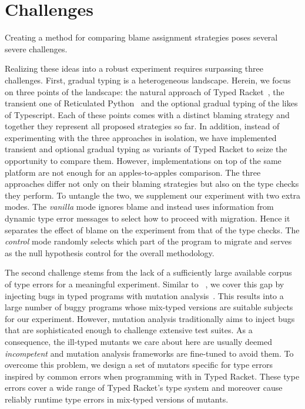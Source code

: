 
\section{Challenges}

Creating a method for comparing blame assignment strategies poses
several severe challenges. 

Realizing these ideas into a robust experiment requires surpassing three challenges.  First,
gradual typing is a heterogeneous landscape. Herein, we focus on three
points of the landscape: the natural approach of Typed
Racket~\cite{tf-dls-2006,tf-popl-2008,tfffgksst-snapl-2017,tf-icfp-2010},
the transient one of Reticulated
Python~\cite{vsc-dls-2019,vss-popl-2017,vksb-dls-2014} and  the optional
gradual typing of the likes of Typescript. Each of these points comes with
a distinct blaming strategy and together they represent all proposed
strategies so far. In addition, instead of experimenting with the three
approaches in isolation, we have implemented transient and optional
gradual typing as variants of  Typed Racket to seize the opportunity to
compare them.  However, implementations on top of the same platform are
not enough for an apples-to-apples comparison. The three approaches differ
not only on their blaming strategies but also on the type checks they
perform. To untangle the two, we supplement our experiment with two extra
modes. The \emph{vanilla} mode  ignores blame and instead uses information
from dynamic type error messages to select how to proceed with migration. Hence it
separates the effect of blame on the experiment from that of the type
checks. The \emph{control} mode randomly selects which part of the program to migrate
and serves as the null hypothesis control for the overall methodology.  


The second challenge stems from the lack of a sufficiently large available
corpus of type errors for a meaningful experiment. Similar to
~\citet{lksfd-popl-2020}, we cover this gap by injecting bugs in
typed programs  with mutation analysis~\cite{lipton1971fault,
demillo1978hints, jia2011analysis}. This results into a large 
number of buggy programs whose mix-typed versions are suitable subjects
for our experiment. However, mutation analysis
traditionally  aims to inject bugs that are sophisticated enough to
challenge extensive test suites. As a consequence, the ill-typed mutants we care about here are
usually deemed \emph{incompetent} and mutation analysis frameworks are
fine-tuned to avoid them. To overcome this problem, we design a
set of mutators specific for type errors inspired by common errors when
programming with in Typed Racket.  These type errors cover
a wide range of Typed Racket's type system and moreover cause reliably runtime
type errors  in mix-typed versions of mutants.

